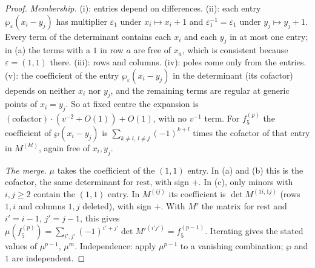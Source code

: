 \begin{proof}
\emph{Membership.} (i): entries depend on differences. (ii): each entry $\wp_\varepsilon(x_i-y_j)$ has multiplier
$\varepsilon_1$ under $x_i\mapsto x_i+1$ and $\varepsilon_1^{-1}=\varepsilon_1$ under $y_j\mapsto y_j+1$. Every term of the determinant
contains each $x_i$ and each $y_j$ in at most one entry; in (a) the terms with a $1$ in row $a$ are free of
$x_a$, which is consistent because $\varepsilon=(1,1)$ there. (iii): rows and columns. (iv): poles come only from
the entries. (v): the coefficient of the entry $\wp_\varepsilon(x_i-y_j)$ in the determinant (its cofactor) depends on
neither $x_i$ nor $y_j$, and the remaining terms are regular at generic points of $x_i=y_j$. So at fixed centre
the expansion is $(\text{cofactor})\cdot(v^{-2}+O(1))+O(1)$, with no $v^{-1}$ term. For $f_5^{(p)}$ the
coefficient of $\wp(x_i-y_j)$ is $\sum_{k\ne i,\,l\ne j}(-1)^{k+l}$ times the cofactor of that entry in
$M^{(kl)}$, again free of $x_i,y_j$.

\emph{The merge.} $\mu$ takes the coefficient of the $(1,1)$ entry. In (a) and (b) this is the cofactor, the
same determinant for $\mathrm{rest}$, with sign $+$. In (c), only minors with $i,j\ge2$ contain the $(1,1)$
entry. In $M^{(ij)}$ its coefficient is $\det M^{(1i,1j)}$ (rows $1,i$ and columns $1,j$ deleted), with sign $+$.
With $M'$ the matrix for $\mathrm{rest}$ and $i'=i-1$, $j'=j-1$, this gives
$\mu(f_5^{(p)})=\sum_{i',j'}(-1)^{i'+j'}\det M'^{(i'j')}=f_5^{(p-1)}$. Iterating gives the stated values of
$\mu^{p-1}$, $\mu^m$. Independence: apply $\mu^{p-1}$ to a vanishing combination; $\wp$ and $1$ are
independent.
\end{proof}

